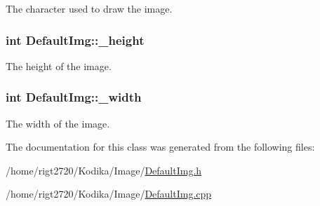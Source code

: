 The character used to draw the image. 

\hypertarget{classDefaultImg_a563e191151451d5d3058ed646b8008ab}{
\subsubsection[{\-\_\-height}]{\setlength{\rightskip}{0pt plus 5cm}int Default\-Img\-::\-\_\-height\hspace{0.3cm}{\ttfamily [private]}}}\label{classDefaultImg_a563e191151451d5d3058ed646b8008ab}


The height of the image. 

\hypertarget{classDefaultImg_a258f5ac708d83e06e924985dab85f221}{
\subsubsection[{\-\_\-width}]{\setlength{\rightskip}{0pt plus 5cm}int Default\-Img\-::\-\_\-width\hspace{0.3cm}{\ttfamily [private]}}}\label{classDefaultImg_a258f5ac708d83e06e924985dab85f221}


The width of the image. 



The documentation for this class was generated from the following files\-:\begin{DoxyCompactItemize}
\item 
/home/rigt2720/\-Kodika/\-Image/\hyperlink{DefaultImg_8h}{Default\-Img.\-h}\item 
/home/rigt2720/\-Kodika/\-Image/\hyperlink{DefaultImg_8cpp}{Default\-Img.\-cpp}\end{DoxyCompactItemize}
